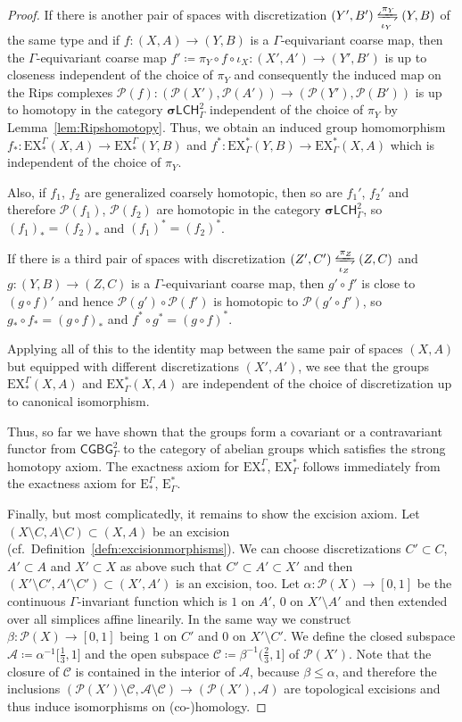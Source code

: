 \documentclass[pdftex]{sigma}
\numberwithin{equation}{section}
\theoremstyle{definition}
\newcommand{\cP}{\mathcal{P}}
\newcommand{\cA}{\mathcal{A}}
\newcommand{\cC}{\mathcal{C}}
\newcommand{\categoryfont}[1]{\mathsf{#1}}
\newcommand{\sLCHz}[1][\Gamma]{\boldsymbol\sigma\categoryfont{LCH}_{#1}^2}
\newcommand{\CGCBG}[1][\Gamma]{\categoryfont{CGBG}_{#1}}
\newcommand{\Homol}{\mathrm{E}}
\newcommand{\Cohom}{\mathrm{E}}
\newcommand{\HomolX}{\mathrm{EX}}
\newcommand{\CohomX}{\mathrm{EX}}
\begin{document}
\begin{proof}
If there is another pair of spaces with discretization $(Y',B')\xleftrightharpoons[\iota_Y]{\pi_Y}(Y,B)$ of the same type and if $f\colon (X,A)\to(Y,B)$ is a $\Gamma$-equivariant coarse map, then the $\Gamma$-equivariant coarse map $f'\coloneqq \pi_Y\circ f\circ\iota_X\colon(X',A')\to (Y',B')$ is up to closeness independent of the choice of $\pi_Y$ and consequently the induced map on the Rips complexes $\cP(f)\colon (\cP(X'),\cP(A'))\to (\cP(Y'),\cP(B'))$ is up to homotopy in the category $\sLCHz$ independent of the choice of $\pi_Y$ by Lemma~\ref{lem:Ripshomotopy}. Thus, we obtain an induced group homomorphism $f_*\colon\HomolX_*^\Gamma(X,A)\to\HomolX_*^\Gamma(Y,B)$ and $f^*\colon\CohomX^*_\Gamma(Y,B)\to\CohomX^*_\Gamma(X,A)$ which is independent of the choice of $\pi_Y$.

Also, if $f_1$, $f_2$ are generalized coarsely homotopic, then so are $f_1'$, $f_2'$ and therefore $\cP(f_1)$, $\cP(f_2)$ are homotopic in the category $\sLCHz$, so $(f_1)_*=(f_2)_*$ and $(f_1)^*=(f_2)^*$.

If there is a third pair of spaces with discretization $(Z',C')\xleftrightharpoons[\iota_Z]{\pi_Z}(Z,C)$ and $g\colon (Y,B)\to (Z,C)$ is a $\Gamma$-equivariant coarse map, then $g'\circ f'$ is close to $(g\circ f)'$ and hence $\cP(g')\circ \cP(f')$ is homotopic to $\cP(g'\circ f')$, so $g_*\circ f_*=(g\circ f)_*$ and $f^*\circ g^*=(g\circ f)^*$.

Applying all of this to the identity map between the same pair of spaces $(X,A)$ but equipped with different discretizations $(X',A')$, we see that the groups $\HomolX_*^\Gamma(X,A)$ and $\CohomX^*_\Gamma(X,A)$ are independent of the choice of discretization up to canonical isomorphism.

Thus, so far we have shown that the groups form a covariant or a contravariant functor from $\CGCBG^2$ to the category of abelian groups which satisfies the strong homotopy axiom. The exactness axiom for $\HomolX_*^\Gamma$, $\CohomX^*_\Gamma$ follows immediately from the exactness axiom for $\Homol_*^\Gamma$, $\Cohom^*_\Gamma$.


Finally, but most complicatedly, it remains to show the excision axiom.
Let $(X\setminus C,A\setminus C)\subset (X,A)$ be an excision (cf.\ Definition~\ref{defn:excisionmorphisms}). We can choose discretizations $C'\subset C$, $A'\subset A$ and $X'\subset X$ as above such that $C'\subset A'\subset X'$ and then $(X'\setminus C',A'\setminus C')\subset (X',A')$ is an excision, too.
Let $\alpha\colon\cP(X)\to [0,1]$ be the continuous $\Gamma$-invariant function which is $1$ on $A'$, $0$ on $X'\setminus A'$ and then extended over all simplices affine linearily. In the same way we construct $\beta\colon \cP(X)\to [0,1]$ being $1$ on $C'$ and $0$ on $X'\setminus C'$. We define the closed subspace $\cA\coloneqq\alpha^{-1}\bigl[\frac13,1\bigr]$ and the open subspace $\cC\coloneqq\beta^{-1}\bigl(\frac23,1\bigr]$ of $\cP(X')$.
Note that the closure of $\cC$ is contained in the interior of $\cA$, because $\beta\leq \alpha$, and therefore the inclusions $(\cP(X')\setminus\cC,\cA\setminus\cC)\to (\cP(X'),\cA)$ are topological excisions and thus induce isomorphisms on \mbox{(co-)}homology.


\end{proof}
\end{document}
